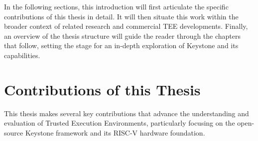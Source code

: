 In the following sections, this introduction will first articulate the specific contributions of this thesis in detail. It will then situate this work within the broader context of related research and commercial TEE developments. Finally, an overview of the thesis structure will guide the reader through the chapters that follow, setting the stage for an in-depth exploration of Keystone and its capabilities.

\section{Contributions of this Thesis}

This thesis makes several key contributions that advance the understanding and evaluation of Trusted Execution Environments, particularly focusing on the open-source Keystone framework and its RISC-V hardware foundation.

